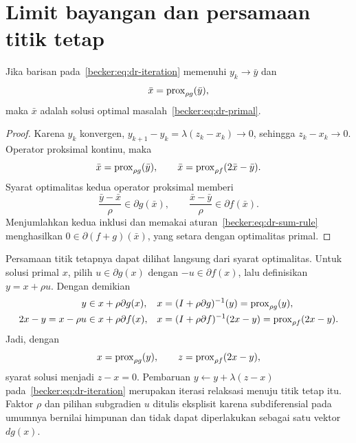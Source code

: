 \section{Limit bayangan dan persamaan titik tetap}
\label{becker:section:dr-fixed-point}

\begin{theorem}
  \label{becker:theorem:dr-shadow-limit}
  Jika barisan pada~\eqref{becker:eq:dr-iteration} memenuhi
  $y_k\to\bar y$ dan
  \begin{equation}
    \bar x=\mathrm{prox}_{\rho g}(\bar y),
  \end{equation}
  maka $\bar x$ adalah solusi optimal
  masalah~\eqref{becker:eq:dr-primal}.
\end{theorem}
\begin{proof}
  Karena $y_k$ konvergen,
  $y_{k+1}-y_k=\lambda(z_k-x_k)\to0$, sehingga $z_k-x_k\to0$.
  Operator proksimal kontinu, maka
  \begin{equation}
    \bar x=\mathrm{prox}_{\rho g}(\bar y),
    \qquad
    \bar x=\mathrm{prox}_{\rho f}(2\bar x-\bar y).
  \end{equation}
  Syarat optimalitas kedua operator proksimal memberi
  \begin{equation}
    \frac{\bar y-\bar x}{\rho}\in\partial g(\bar x),
    \qquad
    \frac{\bar x-\bar y}{\rho}\in\partial f(\bar x).
  \end{equation}
  Menjumlahkan kedua inklusi dan memakai
  aturan~\eqref{becker:eq:dr-sum-rule} menghasilkan
  $0\in\partial(f+g)(\bar x)$, yang setara dengan optimalitas primal.
\end{proof}

Persamaan titik tetapnya dapat dilihat langsung dari syarat optimalitas.
Untuk solusi primal $x$, pilih $u\in\partial g(x)$ dengan
$-u\in\partial f(x)$, lalu definisikan $y=x+\rho u$. Dengan demikian
\begin{equation}
  \label{becker:eq:dr-resolvent-motivation}
  \begin{aligned}
    y&\in x+\rho\partial g(x),
      &x&=(I+\rho\partial g)^{-1}(y)=\mathrm{prox}_{\rho g}(y),\\
    2x-y=x-\rho u&\in x+\rho\partial f(x),
      &x&=(I+\rho\partial f)^{-1}(2x-y)=\mathrm{prox}_{\rho f}(2x-y).
  \end{aligned}
\end{equation}
Jadi, dengan
\begin{equation}
  x=\mathrm{prox}_{\rho g}(y),
  \qquad z=\mathrm{prox}_{\rho f}(2x-y),
\end{equation}
syarat solusi menjadi $z-x=0$. Pembaruan
$y\leftarrow y+\lambda(z-x)$ pada~\eqref{becker:eq:dr-iteration}
merupakan iterasi relaksasi menuju titik tetap itu. Faktor $\rho$ dan pilihan
subgradien $u$ ditulis eksplisit karena subdiferensial pada umumnya bernilai
himpunan dan tidak dapat diperlakukan sebagai satu vektor $d g(x)$.

